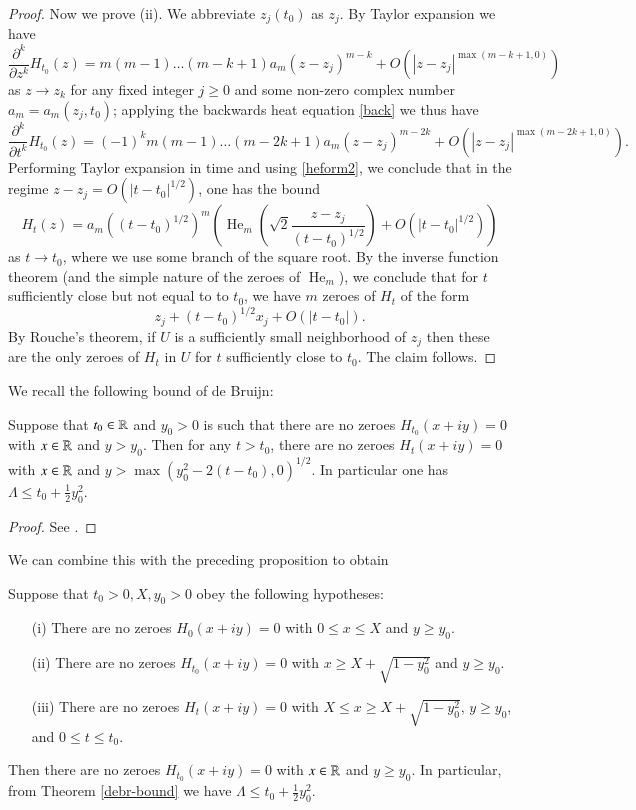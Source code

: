 \begin{proof}
Now we prove (ii).  We abbreviate $z_j(t_0)$ as $z_j$.  By Taylor expansion we have
$$ \frac{\partial^k}{\partial z^k} H_{t_0}(z) = m (m-1) \dots (m-k+1) a_m (z-z_j)^{m-k} + O( |z-z_j|^{\max(m-k+1,0)} )$$
as $z \to z_k$ for any fixed integer $j \geq 0$ and some non-zero complex number $a_m = a_m(z_j, t_0)$; applying the backwards heat equation \eqref{back} we thus have
$$ \frac{\partial^k}{\partial t^k} H_{t_0}(z) = (-1)^k m (m-1) \dots (m-2k+1) a_m (z-z_j)^{m-2k} + O( |z-z_j|^{\max(m-2k+1,0)} ).$$
Performing Taylor expansion in time and using \eqref{heform2}, we conclude that in the regime $z - z_j = O( |t-t_0|^{1/2} )$, one has the bound
$$ H_t(z) = a_m ((t-t_0)^{1/2})^m \left( \operatorname{He}_m\left( \sqrt{2} \frac{z-z_j}{(t-t_0)^{1/2}} \right) + O\left( |t-t_0|^{1/2} \right) \right)$$
as $t \to t_0$, where we use some branch of the square root.  By the inverse function theorem (and the simple nature of the zeroes of $\operatorname{He}_m$), we conclude that for $t$ sufficiently close but not equal to to $t_0$, we have $m$ zeroes of $H_t$ of the form
$$ z_j + (t-t_0)^{1/2} x_j + O( |t-t_0| ).$$
By Rouche's theorem, if $U$ is a sufficiently small neighborhood of $z_j$ then these are the only zeroes of $H_t$ in $U$ for $t$ sufficiently close to $t_0$.  The claim follows.
\end{proof}

We recall the following bound of de Bruijn:

\begin{theorem}\label{debr-bound}  Suppose that $t_0 \in \mathbb{R}$ and $y_0 > 0$ is such that there are no zeroes $H_{t_0}(x+iy)=0$ with $x \in \mathbb{R}$ and $y > y_0$.  Then for any $t>t_0$, there are no zeroes $H_{t}(x+iy)=0$ with $x \in \mathbb{R}$ and $y > \max( y_0^2 - 2(t-t_0), 0)^{1/2}$.  In particular one has $\Lambda \leq t_0 + \frac{1}{2} y_0^2$.
\end{theorem}

\begin{proof} See \cite[Theorem 13]{debr}.
\end{proof}

We can combine this with the preceding proposition to obtain

\begin{theorem}  Suppose that $t_0 > 0, X, y_0 > 0$ obey the following hypotheses:
\begin{itemize}
\item[(i)]  There are no zeroes $H_0(x+iy)=0$ with $0 \leq x \leq X$ and $y \geq y_0$.
\item[(ii)]  There are no zeroes $H_{t_0}(x+iy)=0$ with $x \geq X+\sqrt{1-y_0^2}$ and $y \geq y_0$.
\item[(iii)]  There are no zeroes $H_{t}(x+iy)=0$ with $X \leq x \geq X+\sqrt{1-y_0^2}$, $y \geq y_0$, and $0 \leq t \leq t_0$.
\end{itemize}
Then there are no zeroes $H_{t_0}(x+iy)=0$ with $x \in \mathbb{R}$ and $y \geq y_0$.  In particular, from Theorem \ref{debr-bound}
we have $\Lambda \leq t_0 + \frac{1}{2} y_0^2$.
\end{theorem}

